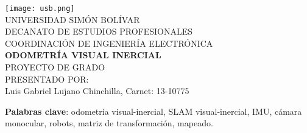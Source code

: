 \begin{titlepage}
    \begin{center}

        \texttt{[image: usb.png]} \\
        \textsc {\large UNIVERSIDAD SIMÓN BOLÍVAR} \\
        \textsc{DECANATO DE ESTUDIOS PROFESIONALES\\
        COORDINACIÓN DE INGENIERÍA ELECTRÓNICA}\\
        \textbf{ODOMETRÍA VISUAL INERCIAL} \\
        PROYECTO DE GRADO \\
        PRESENTADO POR: \\
        Luis Gabriel Lujano Chinchilla, Carnet: 13-10775

    \end{center}
\abstract
{
   
    
}

\noindent \begin{small} \textbf{Palabras clave}: odometría visual-inercial, SLAM visual-inercial, IMU, cámara monocular, robots, matriz de transformación, mapeado. 
\end{small}
	
\clearpage
{}

\end{titlepage}
